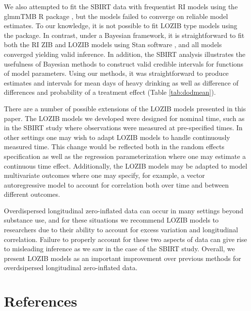 \documentclass[12pt]{article}
\begin{document}
We also attempted to fit the SBIRT data with frequentist RI models using the glmmTMB R package \citep{brooks2017glmmtmb}, but the models failed to converge on reliable model estimates. To our knowledge, it is not possible to fit LOZIB type models using the package. In contrast, under a Bayesian framework, it is straightforward to fit both the RI ZIB and LOZIB models using Stan software \citep{gelman2015stan}, and all models converged yielding valid inference. In addition, the SBIRT analysis illustrates the usefulness of Bayesian methods to construct valid credible intervals for functions of model parameters. Using our methods, it was straightforward to produce estimates and intervals for mean days of heavy drinking as well as difference of differences and probability of a treatment effect (Table \ref{tab:dodmean}).

There are a number of possible extensions of the LOZIB models presented in this paper. The LOZIB models we developed were designed for nominal time, such as in the SBIRT study where observations were measured at pre-specified times. In other settings one may wish to adapt LOZIB models to handle continuously measured time. This change would be reflected both in the random effects specification as well as the regression parameterization where one may estimate a continuous time effect. Additionally, the LOZIB models may be adapted to model multivariate outcomes where one may specify, for example, a vector autoregressive model to account for correlation both over time and between different outcomes.

Overdispersed longitudinal zero-inflated data can occur in many settings beyond substance use, and for these situations we recommend LOZIB models to researchers due to their ability to account for excess variation and longitudinal correlation. Failure to properly account for these two aspects of data can give rise to misleading inference as we saw in the case of the SBIRT study. Overall, we present LOZIB models as an important improvement over previous methods for overdsipersed longitudinal zero-inflated data.


\newpage

\section{References}


\end{document}
